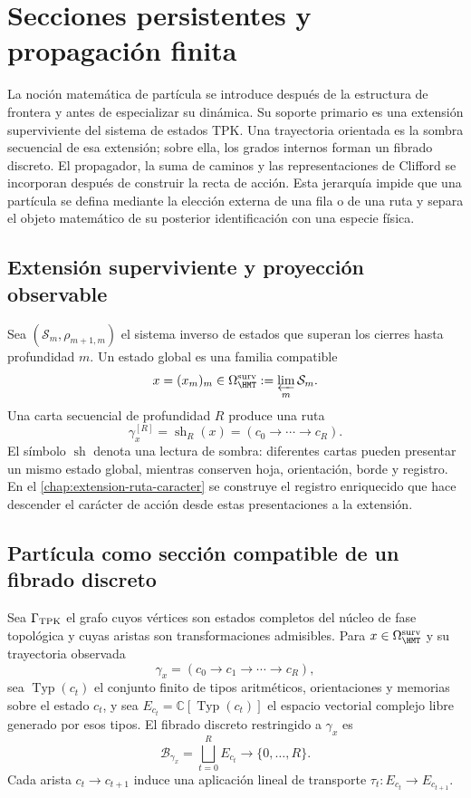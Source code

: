 \chapter{Secciones persistentes y propagación finita}
\label{chap:particula}

La noción matemática de partícula se introduce después de la estructura de
frontera y antes de especializar su dinámica. Su soporte primario es una
extensión superviviente del sistema de estados TPK\@. Una trayectoria
orientada es la sombra secuencial de esa extensión; sobre ella, los grados
internos forman un fibrado discreto. El propagador, la suma de caminos y las
representaciones de Clifford se incorporan después de construir la recta de
acción. Esta jerarquía impide que una partícula se defina mediante la elección
externa de una fila o de una ruta y separa el objeto matemático de su posterior
identificación con una especie física.

\section{Extensión superviviente y proyección observable}

Sea \((\mathcal S_m,\rho_{m+1,m})\) el sistema inverso de estados que
superan los cierres hasta profundidad \(m\). Un estado global es una familia
compatible
\[
 x=(x_m)_m\in\Omega_{\HMT}^{\rm surv}
 :=\varprojlim_m\mathcal S_m.
\]
Una carta secuencial de profundidad \(R\) produce una ruta
\[
 \gamma_x^{[R]}=\operatorname{sh}_R(x)
 =(c_0\longrightarrow\cdots\longrightarrow c_R).
\]
El símbolo \(\operatorname{sh}\) denota una lectura de sombra: diferentes
cartas pueden presentar un mismo estado global, mientras conserven hoja,
orientación, borde y registro. En el
\cref{chap:extension-ruta-caracter} se construye el registro enriquecido que
hace descender el carácter de acción desde estas presentaciones a la
extensión.

\section{Partícula como sección compatible de un fibrado discreto}

Sea \(\Gamma_{\rm TPK}\) el grafo cuyos vértices son estados completos del
núcleo de fase topológica y cuyas aristas son transformaciones admisibles.
Para \(x\in\Omega_{\HMT}^{\rm surv}\) y su trayectoria observada
\[
 \gamma_x=(c_0\longrightarrow c_1\longrightarrow\cdots
 \longrightarrow c_R),
\]
sea \(\operatorname{Typ}(c_t)\) el conjunto finito de tipos aritméticos,
orientaciones y memorias sobre el estado \(c_t\), y sea
\(E_{c_t}=\mathbb C[\operatorname{Typ}(c_t)]\) el espacio vectorial complejo
libre generado por esos tipos. El fibrado discreto restringido a \(\gamma_x\) es
\[
 \mathcal B_{\gamma_x}=\bigsqcup_{t=0}^{R}E_{c_t}
 \longrightarrow\{0,\ldots,R\}.
\]
Cada arista \(c_t\to c_{t+1}\) induce una aplicación lineal de transporte
\(\tau_t:E_{c_t}\to E_{c_{t+1}}\).

